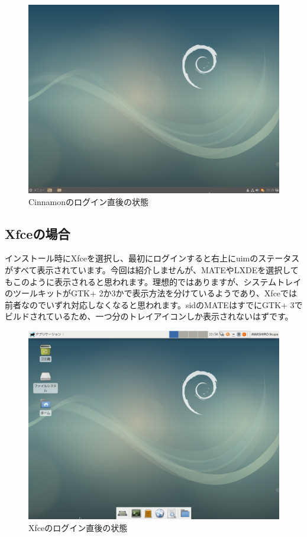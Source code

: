 \documentclass[mingoth,a4paper]{jsarticle}
\begin{document}
\begin{figure}[htbp!]
\centering
\includegraphics[width=\linewidth]{image201708/cinnamon.png}
\caption{Cinnamonのログイン直後の状態}
\end{figure}

\pagebreak
\subsection{Xfceの場合}

インストール時にXfceを選択し、最初にログインすると右上にuimのステータスがすべて表示されています。今回は紹介しませんが、MATEやLXDEを選択してもこのように表示されると思われます。理想的ではありますが、システムトレイのツールキットがGTK+
2か3かで表示方法を分けているようであり、Xfceでは前者なのでいずれ対応しなくなると思われます。sidのMATEはすでにGTK+
3でビルドされているため、一つ分のトレイアイコンしか表示されないはずです。

\begin{figure}[htbp!]
\centering
\includegraphics[width=\linewidth]{image201708/xfce.png}
\caption{Xfceのログイン直後の状態}
\end{figure}
\end{document}
